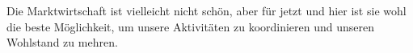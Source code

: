 Die Marktwirtschaft ist vielleicht nicht schön, aber für jetzt und hier ist sie wohl die beste Möglichkeit, um unsere Aktivitäten zu koordinieren und unseren Wohlstand zu mehren.